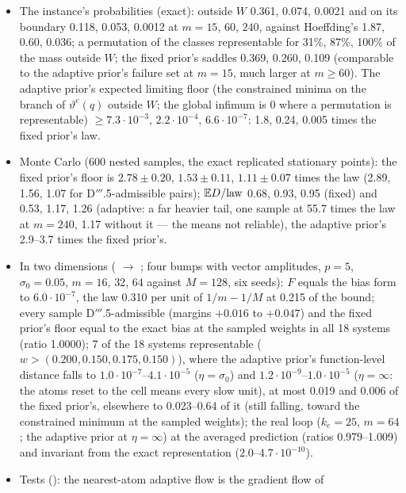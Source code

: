 \begin{itemize}
  \item The instance's probabilities (exact): outside $W$ 0.361, 0.074, 0.0021 and on its boundary 0.118, 0.053,
    0.0012 at $m=15$, $60$, $240$, against Hoeffding's 1.87, 0.60, 0.036; a permutation of the classes representable
    for 31\%, 87\%, 100\% of the mass outside $W$; the fixed prior's saddles 0.369, 0.260, 0.109 (comparable to the
    adaptive prior's failure set at $m=15$, much larger at $m\ge60$). The adaptive prior's expected limiting floor (the
    constrained minima on the branch of $\vartheta^e(q)$ outside $W$; the global infimum is 0 where a permutation is
    representable) $\ge7.3\cdot10^{-3}$, $2.2\cdot10^{-4}$, $6.6\cdot10^{-7}$: 1.8, 0.24, 0.005 times the fixed prior's
    law.
  \item Monte Carlo (600 nested samples, the exact replicated stationary points): the fixed prior's floor is
    $2.78\pm0.20$, $1.53\pm0.11$, $1.11\pm0.07$ times the law (2.89, 1.56, 1.07 for D$'''$.5-admissible pairs);
    $\mathbb{E} D/\mathrm{law}$ 0.68, 0.93, 0.95 (fixed) and 0.53, 1.17, 1.26 (adaptive: a far heavier tail, one sample at
    55.7 times the law at $m=240$, 1.17 without it --- the means not reliable), the adaptive prior's 2.9--3.7 times the
    fixed prior's.
  \item In two dimensions ( $\to$ ; four bumps with
    vector amplitudes, $p=5$, $\sigma_0=0.05$, $m=16$, $32$, $64$ against $M=128$, six seeds): $F$ equals the bias form
    to $6.0\cdot10^{-7}$, the law 0.310 per unit of $1/m-1/M$ at 0.215 of the bound; every sample D$'''$.5-admissible
    (margins $+0.016$ to $+0.047$) and the fixed prior's floor equal to the exact bias at the sampled weights in all 18
    systems (ratio 1.0000); 7 of the 18 systems representable ($w>(0.200,0.150,0.175,0.150)$), where the adaptive
    prior's function-level distance falls to $1.0\cdot10^{-7}$--$4.1\cdot10^{-5}$ ($\eta=\sigma_0$) and
    $1.2\cdot10^{-9}$--$1.0\cdot10^{-5}$ ($\eta=\infty$: the atoms reset to the cell means every slow unit), at most
    0.019 and 0.006 of the fixed prior's, elsewhere to 0.023--0.64 of it (still falling, toward the constrained minimum
    at the sampled weights); the real loop ($k_e=25$, $m=64$; the adaptive prior at $\eta=\infty$) at the averaged
    prediction (ratios 0.979--1.009) and invariant from the exact representation ($2.0$--$4.7\cdot10^{-10}$).
  \item Tests (): the nearest-atom adaptive flow is the gradient flow of

\end{itemize}
